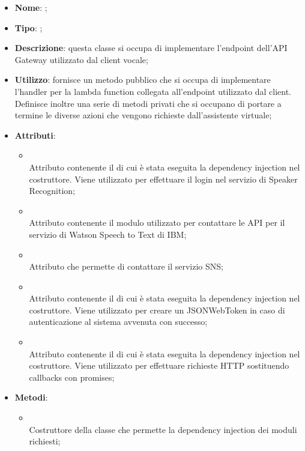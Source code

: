 \begin{itemize}
	\item \textbf{Nome}: ;
	\item \textbf{Tipo}: ;
	\item \textbf{Descrizione}: questa classe si occupa di implementare l'endpoint dell'API Gateway utilizzato dal client vocale;
	\item \textbf{Utilizzo}: fornisce un metodo pubblico che si occupa di implementare l'handler per la lambda function collegata all'endpoint utilizzato dal client. Definisce inoltre una serie di metodi privati che si occupano di portare a termine le diverse azioni che vengono richieste dall'assistente virtuale;
	\item \textbf{Attributi}:
	\begin{itemize}
		\item[]  \\
		Attributo contenente il  di cui è stata eseguita la dependency injection nel costruttore. Viene utilizzato per effettuare il login nel servizio di Speaker Recognition;
		\item[]  \\
		Attributo contenente il modulo utilizzato per contattare le API per il servizio di Watson Speech to Text di IBM;
		\item[]  \\
		Attributo che permette di contattare il servizio SNS;
		\item[]  \\
		Attributo contenente il  di cui è stata eseguita la dependency injection nel costruttore. Viene utilizzato per creare un JSONWebToken in caso di autenticazione al sistema avvenuta con successo;
		\item[]  \\
		Attributo contenente il  di cui è stata eseguita la dependency injection nel costruttore. Viene utilizzato per effettuare richieste HTTP sostituendo callbacks con promises;
	\end{itemize}
	\item \textbf{Metodi}:
	\begin{itemize}
		\item[]  \\		Costruttore della classe  che permette la dependency injection dei moduli richiesti;\\

\end{itemize}
\end{itemize}
